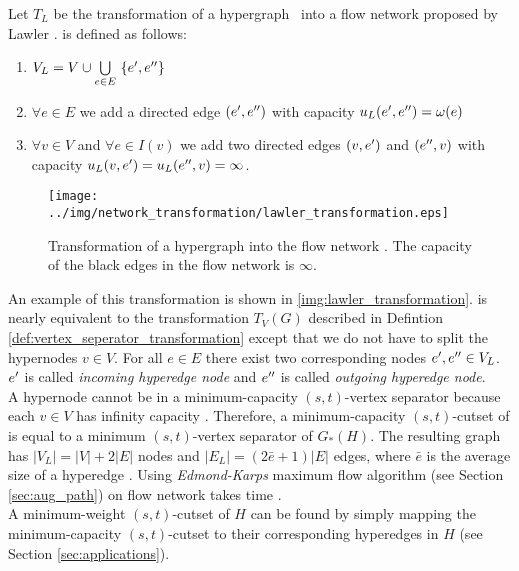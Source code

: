 \begin{definition}
Let $T_L$ be the transformation of a hypergraph \HypergraphDef~into 
a flow network  proposed by Lawler \cite{lawler1973}.  is defined as follows:
\begin{enumerate}
\item $V_L = V \cup \bigcup\limits_{e \in E}\ \{\incoming{e}, \outgoing{e}\}$
\item $\forall e \in E$ we add a directed edge $(e',e'')$ 
      with capacity $u_L(e',e'') = \omega(e)$
\item $\forall v \in V$ and $\forall e \in I(v)$ we add two directed edges $(v, e')$ and 
      $(e'', v)$ with capacity $u_L(v, e') = u_L(e'',v) = \infty$.
\end{enumerate} 
\end{definition}
\begin{figure}
\centering
\texttt{[image: ../img/network\_transformation/lawler\_transformation.eps]}
\caption{Transformation of a hypergraph into the flow network  \cite{lawler1973}. The
capacity of the black edges in the flow network is $\infty$.}
\label{img:lawler_transformation}
\end{figure}
An example of this transformation is shown in \autoref{img:lawler_transformation}.
 is nearly equivalent to the transformation $T_V(G)$ described in Defintion \autoref{def:vertex_seperator_transformation}
except that we do not have to split the hypernodes $v \in V$.
For all $e \in E$ there exist two corresponding nodes $e',e'' \in V_L$. $e'$ 
is called \emph{incoming hyperedge node} and $e''$ is called \emph{outgoing hyperedge node}. \\
A hypernode cannot be in a minimum-capacity $(s,t)$-vertex separator because each $v \in V$ has
infinity capacity \cite{HuMoerder85}. Therefore, a minimum-capacity $(s,t)$-cutset 
of  is equal to a minimum $(s,t)$-vertex separator of $G_*(H)$.
The resulting graph  has $|V_L| = |V| + 2|E|$ nodes and $|E_L| = (2\bar{e}+1)|E|$ edges, where
$\bar{e}$ is the average size of a hyperedge \cite{pistorius2003}. Using \emph{Edmond-Karps}
maximum flow algorithm (see Section \ref{sec:aug_path}) on flow network  
takes time  \cite{lawler1973}. \\
A minimum-weight $(s,t)$-cutset of $H$ can be found by simply mapping the minimum-capacity
$(s,t)$-cutset to their corresponding hyperedges in $H$ (see Section \ref{sec:applications}). 
